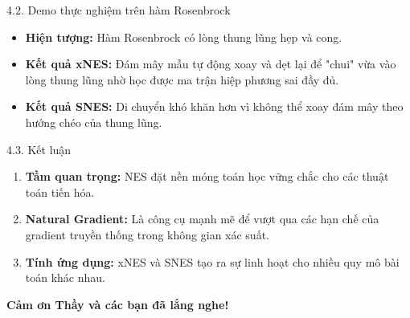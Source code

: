 \documentclass[10pt,xcolor=dvipsnames]{beamer}
\begin{document}
	\begin{frame}{4.2. Demo thực nghiệm trên hàm Rosenbrock}
		
		\begin{itemize}
			\item \textbf{Hiện tượng:} Hàm Rosenbrock có lòng thung lũng hẹp và cong.
			\item \textbf{Kết quả xNES:} Đám mây mẫu tự động xoay và dẹt lại để "chui" vừa vào lòng thung lũng nhờ học được ma trận hiệp phương sai đầy đủ.
			\item \textbf{Kết quả SNES:} Di chuyển khó khăn hơn vì không thể xoay đám mây theo hướng chéo của thung lũng.
		\end{itemize}
	\end{frame}
	
	\begin{frame}{4.3. Kết luận}
		\begin{enumerate}
			\item \textbf{Tầm quan trọng:} NES đặt nền móng toán học vững chắc cho các thuật toán tiến hóa.
			\item \textbf{Natural Gradient:} Là công cụ mạnh mẽ để vượt qua các hạn chế của gradient truyền thống trong không gian xác suất.
			\item \textbf{Tính ứng dụng:} xNES và SNES tạo ra sự linh hoạt cho nhiều quy mô bài toán khác nhau.
		\end{enumerate}
		\vspace{0.4cm}
		\centering
		\LARGE \textbf{Cảm ơn Thầy và các bạn đã lắng nghe!}
	\end{frame}
	
\end{document}
